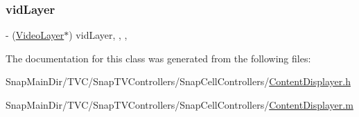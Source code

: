 \hypertarget{interface_content_displayer_afe0c54fd8098df7af42a160113ec6e34}{}\label{interface_content_displayer_afe0c54fd8098df7af42a160113ec6e34} 
\subsubsection{\texorpdfstring{vid\+Layer}{vidLayer}}
{\footnotesize\ttfamily -\/ (\hyperlink{interface_video_layer}{Video\+Layer}$\ast$) vid\+Layer\hspace{0.3cm}{\ttfamily [read]}, {\ttfamily [write]}, {\ttfamily [nonatomic]}, {\ttfamily [strong]}}



The documentation for this class was generated from the following files\+:\begin{DoxyCompactItemize}
\item 
Snap\+Main\+Dir/\+T\+V\+C/\+Snap\+T\+V\+Controllers/\+Snap\+Cell\+Controllers/\hyperlink{_content_displayer_8h}{Content\+Displayer.\+h}\item 
Snap\+Main\+Dir/\+T\+V\+C/\+Snap\+T\+V\+Controllers/\+Snap\+Cell\+Controllers/\hyperlink{_content_displayer_8m}{Content\+Displayer.\+m}\end{DoxyCompactItemize}
